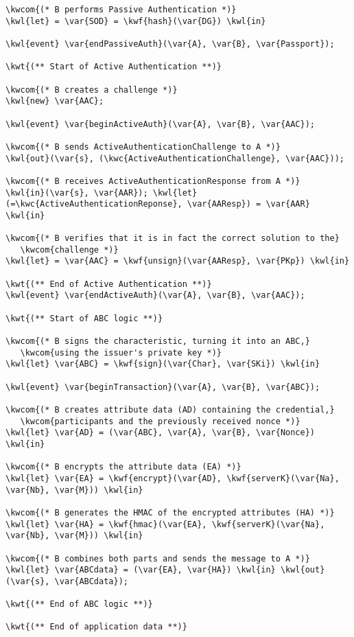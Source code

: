 \begin{Verbatim}[commandchars=\\\{\},codes={\catcode`$=3}]
\kwcom{(* B performs Passive Authentication *)}
\kwl{let} = \var{SOD} = \kwf{hash}(\var{DG}) \kwl{in}

\kwl{event} \var{endPassiveAuth}(\var{A}, \var{B}, \var{Passport});

\kwt{(** Start of Active Authentication **)}

\kwcom{(* B creates a challenge *)}
\kwl{new} \var{AAC};

\kwl{event} \var{beginActiveAuth}(\var{A}, \var{B}, \var{AAC});

\kwcom{(* B sends ActiveAuthenticationChallenge to A *)}
\kwl{out}(\var{s}, (\kwc{ActiveAuthenticationChallenge}, \var{AAC}));

\kwcom{(* B receives ActiveAuthenticationResponse from A *)}
\kwl{in}(\var{s}, \var{AAR}); \kwl{let} (=\kwc{ActiveAuthenticationReponse}, \var{AAResp}) = \var{AAR} \kwl{in}

\kwcom{(* B verifies that it is in fact the correct solution to the}
   \kwcom{challenge *)}
\kwl{let} = \var{AAC} = \kwf{unsign}(\var{AAResp}, \var{PKp}) \kwl{in}

\kwt{(** End of Active Authentication **)}
\kwl{event} \var{endActiveAuth}(\var{A}, \var{B}, \var{AAC});

\kwt{(** Start of ABC logic **)}

\kwcom{(* B signs the characteristic, turning it into an ABC,}
   \kwcom{using the issuer's private key *)}
\kwl{let} \var{ABC} = \kwf{sign}(\var{Char}, \var{SKi}) \kwl{in}

\kwl{event} \var{beginTransaction}(\var{A}, \var{B}, \var{ABC});

\kwcom{(* B creates attribute data (AD) containing the credential,}
   \kwcom{participants and the previously received nonce *)}
\kwl{let} \var{AD} = (\var{ABC}, \var{A}, \var{B}, \var{Nonce}) \kwl{in}

\kwcom{(* B encrypts the attribute data (EA) *)}
\kwl{let} \var{EA} = \kwf{encrypt}(\var{AD}, \kwf{serverK}(\var{Na}, \var{Nb}, \var{M})) \kwl{in}

\kwcom{(* B generates the HMAC of the encrypted attributes (HA) *)}
\kwl{let} \var{HA} = \kwf{hmac}(\var{EA}, \kwf{serverK}(\var{Na}, \var{Nb}, \var{M})) \kwl{in}

\kwcom{(* B combines both parts and sends the message to A *)}
\kwl{let} \var{ABCdata} = (\var{EA}, \var{HA}) \kwl{in} \kwl{out}(\var{s}, \var{ABCdata});

\kwt{(** End of ABC logic **)}

\kwt{(** End of application data **)}


\end{Verbatim}
